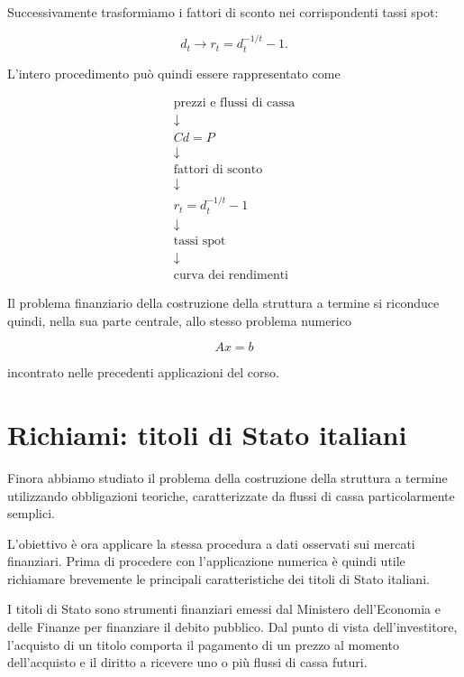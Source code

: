 Successivamente trasformiamo i fattori di sconto nei
corrispondenti tassi spot:

\begin{equation*}
    d_t
    \longrightarrow
    r_t=d_t^{-1/t}-1.
\end{equation*}

L'intero procedimento può quindi essere rappresentato come

\begin{equation*}
\boxed{
\begin{array}{c}
\text{prezzi e flussi di cassa}\\
\downarrow\\
Cd=P\\
\downarrow\\
\text{fattori di sconto}\\
\downarrow\\
r_t=d_t^{-1/t}-1\\
\downarrow\\
\text{tassi spot}\\
\downarrow\\
\text{curva dei rendimenti}
\end{array}}
\end{equation*}

Il problema finanziario della costruzione della struttura a termine
si riconduce quindi, nella sua parte centrale, allo stesso problema
numerico

\begin{equation*}
    Ax=b
\end{equation*}

incontrato nelle precedenti applicazioni del corso.

\section{Richiami: titoli di Stato italiani}
\label{subsec:titoli-stato-italiani}

Finora abbiamo studiato il problema della costruzione della struttura
a termine utilizzando obbligazioni teoriche, caratterizzate da flussi
di cassa particolarmente semplici.

L'obiettivo è ora applicare la stessa procedura a dati osservati sui
mercati finanziari. Prima di procedere con l'applicazione numerica è
quindi utile richiamare brevemente le principali caratteristiche dei
titoli di Stato italiani.

I titoli di Stato sono strumenti finanziari emessi dal Ministero
dell'Economia e delle Finanze per finanziare il debito pubblico.
Dal punto di vista dell'investitore, l'acquisto di un titolo comporta
il pagamento di un prezzo al momento dell'acquisto e il diritto a
ricevere uno o più flussi di cassa futuri.

